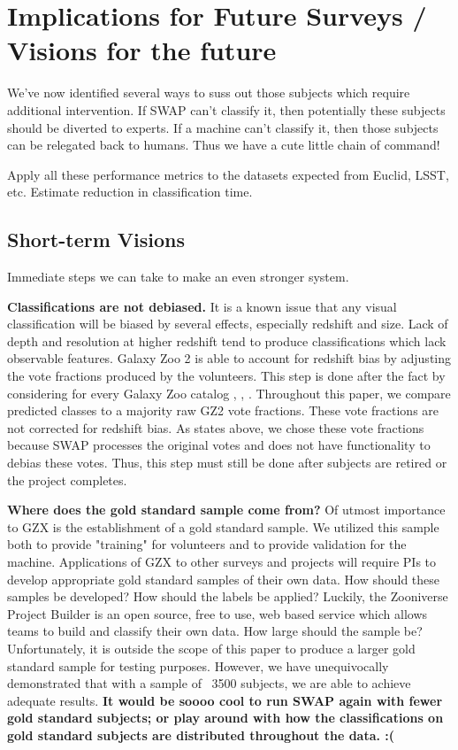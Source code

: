 \documentclass[twocolumn]{aastex6}
\begin{document}
\section{Implications for Future Surveys / Visions for the future}
We've now identified several ways to suss out those subjects which require
additional intervention. If SWAP can't classify it, then potentially these subjects 
should be diverted to experts. If a machine can't classify it, then those subjects
can be relegated back to humans. Thus we have a cute little chain of command!

Apply all these performance metrics to the datasets expected from Euclid, LSST, etc. 
Estimate reduction in classification time. 

\subsection{Short-term Visions}

Immediate steps we can take to make an even stronger system. 

\textbf{Classifications are not debiased.}  
It is a known issue that any visual 
classification will be biased by several effects, especially redshift and size. 
Lack of depth and resolution at higher redshift tend to produce classifications 
which lack observable features. Galaxy Zoo 2 is able to account for redshift bias
by adjusting the vote fractions produced by the volunteers. This step is done after
the fact by considering for every Galaxy Zoo catalog
 \cite{Willett2013}, \cite{Willett2016}, \cite{Simmons2016}. 
Throughout this paper, we compare predicted classes to a majority raw GZ2 vote fractions.
These vote fractions are not corrected for redshift bias. As states above, we chose
these vote fractions because SWAP processes the original votes and does not 
have functionality to debias these votes. Thus, this step must still be done 
after subjects are retired or the project completes. 


\textbf{Where does the gold standard sample come from?}
Of utmost importance to GZX is the establishment of a gold standard sample. 
We utilized this sample both to provide "training" for volunteers and to provide 
validation for the machine. Applications of GZX to other surveys and projects will
require PIs to develop appropriate gold standard samples of their own data. 
How should these samples be developed?
How should the labels be applied? Luckily, the Zooniverse Project Builder is an 
open source, free to use, web based service which allows teams to build and classify
their own data.
 How large should the sample be?  Unfortunately, it is outside the scope of this paper
to produce a larger gold standard sample for testing purposes. However, we have 
unequivocally demonstrated that with a sample of ~3500 subjects, we are able to 
achieve adequate results. 
\textbf{It would be soooo cool to run SWAP again with fewer gold standard subjects; 
or play around with how the classifications on gold standard subjects are distributed throughout the data. :(}
\end{document}
